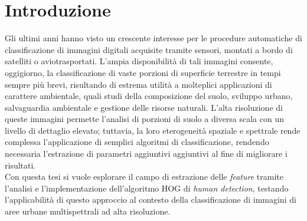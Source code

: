 

\chapter*{Introduzione}
\label{Introduzione}

Gli ultimi anni hanno visto un crescente interesse per le procedure automatiche di classificazione di immagini digitali acquisite tramite sensori, montati a bordo di satelliti o aviotrasportati. 
L'ampia disponibilità di tali immagini consente, oggigiorno, la classificazione di vaste porzioni di superficie terrestre in tempi sempre più brevi, risultando di estrema utilità a molteplici applicazioni di carattere ambientale, quali studi della composizione del suolo, sviluppo urbano, salvaguardia ambientale e gestione delle risorse naturali. 
L'alta risoluzione di queste immagini permette l'analisi di porzioni di suolo a diversa scala con un  livello di dettaglio elevato; tuttavia, la loro eterogeneità spaziale e spettrale rende complessa l'applicazione di semplici algoritmi di classificazione, rendendo necessaria l'estrazione di parametri aggiuntivi aggiuntivi al fine di migliorare i risultati.\\
Con questa tesi si vuole esplorare il campo di estrazione delle \emph{feature} tramite l'analisi e l'implementazione dell'algoritmo HOG di \emph{human detection}, testando l'applicabilità di questo approccio al contesto della classificazione di immagini di aree urbane multispettrali ad alta risoluzione.\\

